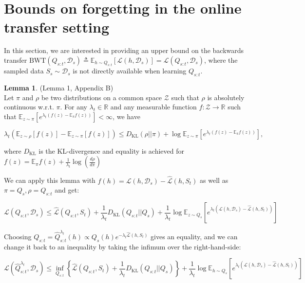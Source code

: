 \documentclass[letterpaper]{article}
\theoremstyle{definition}
\newtheorem{lemma}{Lemma}[section]
\begin{document}
\section{Bounds on forgetting in the online transfer setting}

In this section, we are interested in providing an upper bound on the backwards transfer $\mathrm{BWT}(Q_{s:t}, \mathcal{D}_s) \triangleq \mathbb{E}_{h\sim Q_{s:t}}\left [\mathcal{L}(h, \mathcal{D}_s)\right ]=\mathcal{L}(Q_{s:t},\mathcal{D}_s)$, where the sampled data $S_s\sim \mathcal{D}_s$ is not directly available when learning $Q_{s:t}$.

\begin{lemma} \label{lemma:concentration} \cite{shui2020beyond} (Lemma 1, Appendix B) \\
	Let $\pi$ and $\rho$ be two distributions on a common space $\mathcal{Z}$ such that $\rho$ is absolutely continuous w.\!r.\!t.\! $\pi$. For any $\lambda_t\in \mathbb{R}$ and any measurable function $f:\mathcal{Z}\rightarrow \mathbb{R}$ such that $\mathbb{E}_{z\sim \pi}\left [e^{\lambda_t(f(z)-\mathbb{E}_\pi f(z))} \right ]<\infty$, we have
	
	\begin{equation}
	\lambda_t\left (\mathbb{E}_{z\sim \rho}\left [f(z) \right ]-\mathbb{E}_{z\sim \pi}\left [f(z) \right ]\right )\leq D_{\mathrm{KL}}(\rho||\pi)+ \log\mathbb{E}_{z\sim \pi}\left [e^{\lambda_t(f(z)-\mathbb{E}_\pi f(z))} \right ],
	\end{equation}
	
	where $D_{\mathrm{KL}}$ is the KL-divergence and equality is achieved for $f(z)=\mathbb{E}_\pi f(z)+\frac{1}{\lambda_t}\log(\frac{d\rho}{d\pi})$
\end{lemma}

We can apply this lemma with $f(h)=\mathcal{L}(h,\mathcal{D}_s)-\hat{\mathcal{L}}(h,S_t)$ as well as $\pi=Q_s, \rho=Q_{s:t}$ and get:

$$
\mathcal{L}(Q_{s:t},\mathcal{D}_s)\leq \hat{\mathcal{L}}(Q_{s:t},S_t)+\frac{1}{\lambda_t}D_{\mathrm{KL}}(Q_{s:t}||Q_s)+\frac{1}{\lambda_t}\log \mathbb{E}_{z\sim Q_s}\left [e^{\lambda_t(\mathcal{L}(h,\mathcal{D}_s)-\hat{\mathcal{L}}(h,S_t))} \right ]
$$

Choosing $Q_{s:t}=\hat{Q}^{\lambda_t}_{s:t}(h)\propto Q_s(h)e^{-\lambda_t\hat{\mathcal{L}}(h,S_t)}$ gives an equality, and we can change it back to an inequality by taking the infimum over the right-hand-side:

$$\mathcal{L}( \hat{Q}^{\lambda_t}_{s:t},\mathcal{D}_s)\leq \inf_{Q_{s:t}}\left \{ \hat{\mathcal{L}}(Q_{s:t},S_t) + \frac{1}{\lambda_t}D_{\mathrm{KL}}(Q_{s:t}||Q_{s}) \right \}+\frac{1}{\lambda_t}\log\mathbb{E}_{h\sim Q_s}\left [e^{\lambda_t(\mathcal{L}(h,\mathcal{D}_s)-\hat{\mathcal{L}}(h,S_t))} \right ]$$
\end{document}
